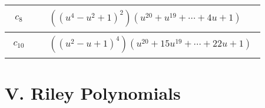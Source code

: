 \documentclass[1p]{elsarticle_modified}
\theoremstyle{definition}
\begin{document}
\begin{tabular}{m{50pt}|m{274pt}}
\hline $$\begin{aligned}c_{8}\end{aligned}$$&$\begin{aligned}
&((u^4- u^2+1)^2)(u^{20}+u^{19}+\cdots+4 u+1)
\end{aligned}$\\
\hline $$\begin{aligned}c_{10}\end{aligned}$$&$\begin{aligned}
&((u^2- u+1)^4)(u^{20}+15 u^{19}+\cdots+22 u+1)
\end{aligned}$\\
\hline
\end{tabular}\newpage\renewcommand{\arraystretch}{1}
\centering \section*{ V. Riley Polynomials}
\end{document}
